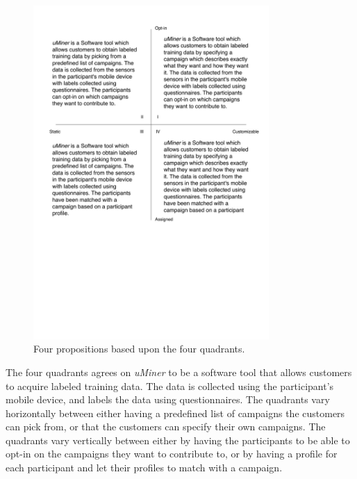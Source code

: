 \begin{figure}[!htbp]
	\centering
	\includegraphics[width=0.8\textwidth]{graphic/problem_analysis/vision/propositions.pdf}
	\caption{Four propositions based upon the four quadrants.}
	\label{fig:proposition}
\end{figure}
\FloatBarrier

The four quadrants agrees on \emph{uMiner} to be a software tool that allows customers to acquire labeled training data. The data is collected using the participant's mobile device, and labels the data using questionnaires. The quadrants vary horizontally between either having a predefined list of campaigns the customers can pick from, or that the customers can specify their own campaigns. The quadrants vary vertically between either by having the participants to be able to opt-in on the campaigns they want to contribute to, or by having a profile for each participant and let their profiles to match with a campaign.
